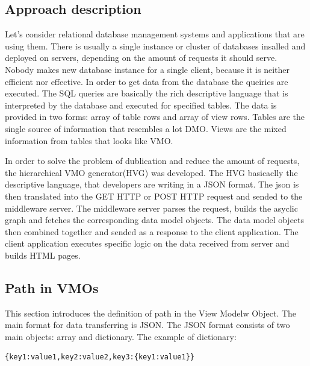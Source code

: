 \subsection{Approach description}

Let's consider relational database management systems and applications that are using them. There is usually a single instance or cluster of databases insalled and deployed on servers, depending on the amount of requests it should serve. Nobody makes new database instance for a single client, because it is neither efficient nor effective. In order to get data from the database the queiries are executed. The SQL queries are basically the rich descriptive language that is interpreted by the database and executed for specified tables. The data is provided in two forms: array of table rows and array of view rows. Tables are the single source of information that resembles a lot DMO. Views are the mixed information from tables that looks like VMO. 

In order to solve the problem of dublication and reduce the amount of requests, the hierarchical VMO generator(HVG) was developed. The HVG basicaclly the descriptive language, that developers are writing in a JSON format. The json is then translated into the GET HTTP or POST HTTP request and sended  to the middleware server. The middleware server parses the request, builds the asyclic graph and fetches the corresponding data model objects. The data model objects then combined together and sended as a response to the client application. The client application executes specific logic on the data received from server and builds HTML pages.



\subsection{Path in VMOs}

This section introduces the definition of path in the View Modelw Object. The main format for data transferring is JSON. The JSON format consists of two main objects: array and dictionary. The example of dictionary:

\lstset{ %
    caption=The example of JSON dictionary,
    basicstyle=\ttfamily\footnotesize\bfseries,
    linewidth=0.6\textwidth
 }
\begin{lstlisting}[linewidth=5cm]
	{key1:value1,key2:value2,key3:{key1:value1}}
\end{lstlisting}

